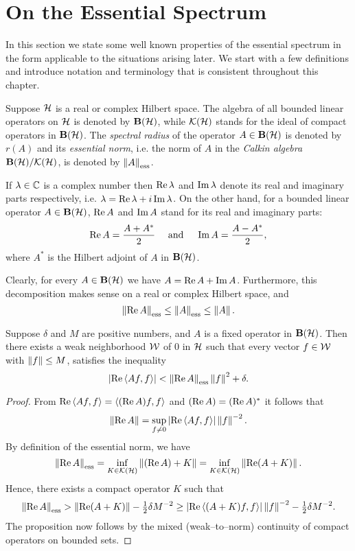 \goodbreak
\section{On the Essential Spectrum}

In this section we state some well known properties of the
essential spectrum in the form applicable to the situations
arising later. We start with a few definitions and introduce
notation and terminology that is consistent throughout this
chapter.

\begin{defn}
Suppose ${\cal H}$ is a real or complex Hilbert space. The algebra of
all bounded linear operators on ${\cal H}$ is denoted by $\mathbf B(\cal H)$, while
$\cal K(\cal H)$ stands for the ideal of compact operators in $\mathbf B(\cal H)$. The
{\em spectral radius} of the operator $A\in\mathbf B(\cal H)$ is denoted by
$r(A)$ and its {\em essential norm}, i.e. the norm of $A$ in
the {\em Calkin algebra}\, $\mathbf B(\cal H)/\cal K(\cal H)$, is denoted by
$\essnorm{A}$.
\end{defn}

\begin{defn}
If $\lambda\in\mathbb C$ is a complex number then $\operatorname{Re}\lambda$
and $\operatorname{Im}\lambda$ denote its real and imaginary parts
respectively, i.e. $\lambda=\operatorname{Re}\lambda+i\operatorname{Im}\lambda$. On the
other hand, for a bounded linear operator $A\in\mathbf B(\cal H)$, $\operatorname{Re}{A}$
and $\operatorname{Im}{A}$ stand for its real and imaginary parts:
\[ \operatorname{Re}{A}=\frac{A+A^*}{2} \quad \text{ and } \quad
   \operatorname{Im}{A}=\frac{A-A^*}{2}, \]
where $A^*$ is the Hilbert adjoint of $A$ in $\mathbf B(\cal H)$.
\end{defn}

Clearly, for every $A\in\mathbf B(\cal H)$ we have $A=\operatorname{Re}{A}+\operatorname{Im}{A}$.
Furthermore, this decomposition makes sense on a real or
complex Hilbert space, and
\begin{equation}\label{e:EssIE}
  \essnorm{\RE A} \leq \essnorm{A} \leq \norm{A}.
\end{equation}

\begin{prop} \label{p:EssNR}
Suppose $\delta$ and $M$ are positive numbers, and $A$ is a
fixed operator in $\mathbf B(\cal H)$. Then there exists a weak neighborhood
${\cal W}$ of $0$ in ${\cal H}$ such that every vector $f\in{\cal W}$ with
$\left\Vert f\right\Vert\leq{}M$, satisfies the inequality
\[ \abs{\RE\seq{A f,f}} < \essnorm{\RE{}A}\norm{f}^2 + \delta. \]
\end{prop}

\begin{proof}
From $\operatorname{Re}\left<A f,f\right>=\left<(\operatorname{Re}{A})f,f\right>$ and
$(\operatorname{Re}{A})=(\operatorname{Re}{A})^*$ it follows that
\[ \left\Vert\operatorname{Re}{}A\right\Vert = \sup_{f\neq0}
   \left\vert\operatorname{Re}\left<A f,f\right>\right\vert\left\Vert f\right\Vert^{-2}. \]
By definition of the essential norm, we have
\[ \essnorm{\RE A} = \inf_{K\in\KH} \norm{(\RE A)+K} =
   \inf_{K\in\KH} \norm{\RE(A+K)}. \]
Hence, there exists a compact operator $K$ such that
\[ \essnorm{\RE A} > \norm{\RE(A+K)}    - \tfrac{1}{2}\delta M^{-2} \geq
   \abs{\RE\seq{(A+K)f,f}}\norm{f}^{-2} - \tfrac{1}{2}\delta M^{-2} . \]
The proposition now follows by the mixed (weak--to--norm)
continuity of compact operators on bounded sets.
\end{proof}

